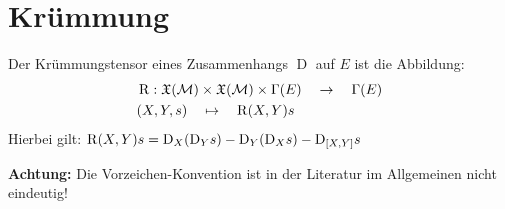 \section{Krümmung}

\begin{defs}[Krümmungstensor]
Der Krümmungstensor eines Zusammenhangs $\operatorname{D}$ auf $E$ ist die Abbildung:
\begin{align*}
&\operatorname{R}: \mathfrak{X}(\mathcal{M}) \times \mathfrak{X}(\mathcal{M}) \times \Gamma(E) \quad \rightarrow \quad \Gamma(E) \\
&(X, Y, s) \quad \mapsto \quad \operatorname{R}(X,Y)s \\
\end{align*}
Hierbei gilt:  \quad $\operatorname{R}(X,Y)s = \mathrm{D}_X(\mathrm{D}_Ys) - \mathrm{D}_Y(\mathrm{D}_Xs) - \mathrm{D}_{[X,Y]}s$
\end{defs}

\textbf{Achtung:} Die Vorzeichen-Konvention ist in der Literatur im Allgemeinen nicht eindeutig!


